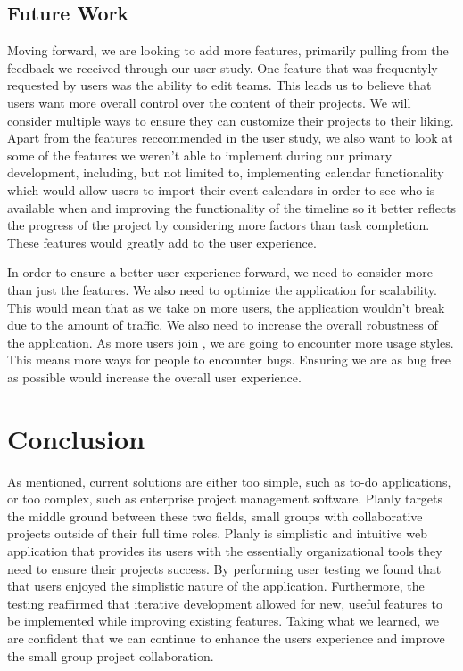 \subsection{Future Work}
Moving forward, we are looking to add more features, primarily pulling from the feedback we received through our user study. One feature that was frequentyly requested by users was the ability to edit teams. This leads us to believe that users want more overall control over the content of their projects. We will consider multiple ways to ensure they can customize their projects to their liking. Apart from the features reccommended in the user study, we also want to look at some of the features we weren't able to implement during our primary development, including, but not limited to, implementing calendar functionality which would allow users to import their event calendars in order to see who is available when and improving the functionality of the timeline so it better reflects the progress of the project by considering more factors than task completion. These features would greatly add to the user experience.
\par In order to ensure a better user experience forward, we need to consider more than just the features. We also need to optimize the application for scalability. This would mean that as we take on more users, the application wouldn't break due to the amount of traffic. We also need to increase the overall robustness of the application. As more users join \projectTitle{}, we are going to encounter more usage styles. This means more ways for people to encounter bugs. Ensuring we are as bug free as possible would increase the overall user experience. 


\section{Conclusion}
As mentioned, current solutions are either too simple, such as to-do applications, or too complex, such as enterprise project management software. Planly targets the middle ground between these two fields, small groups with collaborative projects outside of their full time roles. Planly is simplistic and intuitive web application that provides its users with the essentially organizational tools they need to ensure their projects\textsc{} success. By performing user testing we found that that users enjoyed the simplistic nature of the application. Furthermore, the testing reaffirmed that iterative development allowed for new, useful features to be implemented while improving existing features. Taking what we learned, we are confident that we can continue to enhance the users\textsc{} experience and improve the small group project collaboration.

